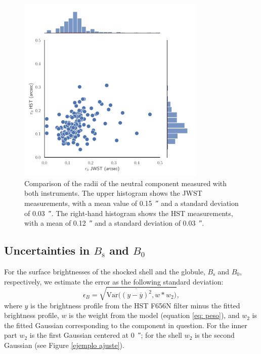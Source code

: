 \documentclass{book}
\begin{document}
\begin{figure}[htb]
    \centering
    \includegraphics[width=0.8\textwidth]{imagenes_corregidas/r_0.pdf}
    \caption{Comparison of the radii of the neutral component measured
      with both instruments. The upper histogram shows the JWST
      measurements, with a mean value of \SI{0.15}{\arcsecond} and a
      standard deviation of \SI{0.03}{\arcsecond}. The right-hand
      histogram shows the HST measurements, with a mean of
      \SI{0.12}{\arcsecond} and a standard deviation of
      \SI{0.03}{\arcsecond}.}
    \label{fig:Rcore dis}
\end{figure}

\subsection{\boldmath Uncertainties in $B_\mathrm{s}$ and $B_0$}

For the surface brightnesses of the shocked shell and the globule,
$B_\mathrm{s}$ and $B_0$, respectively, we estimate the error as the
following standard deviation:
\begin{equation}
  \epsilon_{B}=\sqrt{\mathrm{Var}\Big(\overline{(y-\overline{y})^2},w*w_2\Big)}, 
\end{equation}
where $y$ is the brightness profile from the HST F656N filter minus
the fitted brightness profile, $w$ is the weight from the model
(equation \ref{eq: peso}), and $w_2$ is the fitted Gaussian
corresponding to the component in question. For the inner part $w_2$
is the first Gaussian centered at \SI{0}{\arcsecond}; for the shell
$w_2$ is the second Gaussian (see Figure \ref{ejemplo ajuste}).
\end{document}
